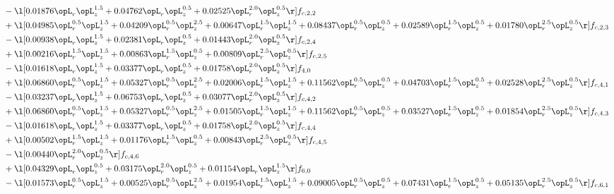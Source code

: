 \begin{alignat}{2}
& - \l[  0.01876 \opL_r \opL_z^{1.5} +  0.04762 \opL_r \opL_z^{0.5} +  0.02525 \opL_r^{2.0} \opL_z^{0.5}  \r] f_{c,2,2} \nonumber \\ 
& + \l[  0.04985 \opL_r^{0.5} \opL_z^{1.5} +  0.04209 \opL_r^{0.5} \opL_z^{2.5} +  0.00647 \opL_r^{1.5} \opL_z^{1.5} +  0.08437 \opL_r^{0.5} \opL_z^{0.5} +  0.02589 \opL_r^{1.5} \opL_z^{0.5} +  0.01780 \opL_r^{2.5} \opL_z^{0.5}  \r] f_{c,2,3} \nonumber \\ 
& - \l[  0.00938 \opL_r \opL_z^{1.5} +  0.02381 \opL_r \opL_z^{0.5} +  0.01443 \opL_r^{2.0} \opL_z^{0.5}  \r] f_{c,2,4} \nonumber \\ 
& + \l[  0.00216 \opL_r^{1.5} \opL_z^{1.5} +  0.00863 \opL_r^{1.5} \opL_z^{0.5} +  0.00809 \opL_r^{2.5} \opL_z^{0.5}  \r] f_{c,2,5} \nonumber \\ 
& - \l[  0.01618 \opL_r \opL_z^{1.5} +  0.03377 \opL_r \opL_z^{0.5} +  0.01758 \opL_r^{2.0} \opL_z^{0.5}  \r] f_{4,0} \nonumber \\ 
& + \l[  0.06860 \opL_r^{0.5} \opL_z^{1.5} +  0.05327 \opL_r^{0.5} \opL_z^{2.5} +  0.02006 \opL_r^{1.5} \opL_z^{1.5} +  0.11562 \opL_r^{0.5} \opL_z^{0.5} +  0.04703 \opL_r^{1.5} \opL_z^{0.5} +  0.02528 \opL_r^{2.5} \opL_z^{0.5}  \r] f_{c,4,1} \nonumber \\ 
& - \l[  0.03237 \opL_r \opL_z^{1.5} +  0.06753 \opL_r \opL_z^{0.5} +  0.03077 \opL_r^{2.0} \opL_z^{0.5}  \r] f_{c,4,2} \nonumber \\ 
& + \l[  0.06860 \opL_r^{0.5} \opL_z^{1.5} +  0.05327 \opL_r^{0.5} \opL_z^{2.5} +  0.01505 \opL_r^{1.5} \opL_z^{1.5} +  0.11562 \opL_r^{0.5} \opL_z^{0.5} +  0.03527 \opL_r^{1.5} \opL_z^{0.5} +  0.01854 \opL_r^{2.5} \opL_z^{0.5}  \r] f_{c,4,3} \nonumber \\ 
& - \l[  0.01618 \opL_r \opL_z^{1.5} +  0.03377 \opL_r \opL_z^{0.5} +  0.01758 \opL_r^{2.0} \opL_z^{0.5}  \r] f_{c,4,4} \nonumber \\ 
& + \l[  0.00502 \opL_r^{1.5} \opL_z^{1.5} +  0.01176 \opL_r^{1.5} \opL_z^{0.5} +  0.00843 \opL_r^{2.5} \opL_z^{0.5}  \r] f_{c,4,5} \nonumber \\ 
& - \l[  0.00440 \opL_r^{2.0} \opL_z^{0.5}  \r] f_{c,4,6} \nonumber \\ 
& + \l[  0.04329 \opL_r \opL_z^{0.5} +  0.03175 \opL_r^{2.0} \opL_z^{0.5} +  0.01154 \opL_r \opL_z^{1.5}  \r] f_{6,0} \nonumber \\ 
& - \l[  0.01573 \opL_r^{0.5} \opL_z^{1.5} +  0.00525 \opL_r^{0.5} \opL_z^{2.5} +  0.01954 \opL_r^{1.5} \opL_z^{1.5} +  0.09005 \opL_r^{0.5} \opL_z^{0.5} +  0.07431 \opL_r^{1.5} \opL_z^{0.5} +  0.05135 \opL_r^{2.5} \opL_z^{0.5}  \r] f_{c,6,1} \nonumber \\ 

\end{alignat}
